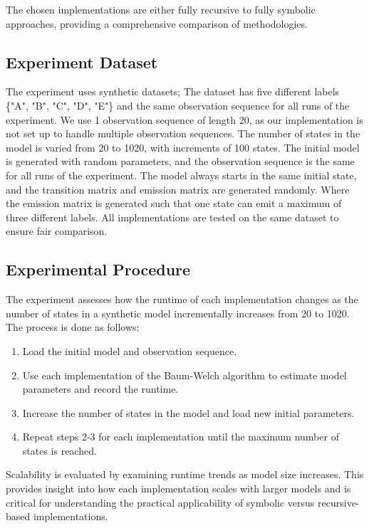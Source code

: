 The chosen implementations are either fully recursive to fully symbolic approaches, providing a comprehensive comparison of methodologies.

\subsection{Experiment Dataset}
The experiment uses synthetic datasets; The dataset has five different labels \{"A", "B", "C", "D", "E"\} and the same observation sequence for all runs of the experiment. 
We use 1 observation sequence of length 20, as our implementation is not set up to handle multiple observation sequences.
The number of states in the model is varied from 20 to 1020, with increments of 100 states.
The initial model is generated with random parameters, and the observation sequence is the same for all runs of the experiment.
The model always starts in the same initial state, and the transition matrix and emission matrix are generated randomly.
Where the emission matrix is generated such that one state can emit a maximum of three different labels.
All implementations are tested on the same dataset to ensure fair comparison.

\subsection{Experimental Procedure}
The experiment assesses how the runtime of each implementation changes as the number of states in a synthetic model incrementally increases from 20 to 1020. 
The process is done as follows:

\begin{enumerate}
\item Load the initial model and observation sequence.
\item Use each implementation of the Baum-Welch algorithm to estimate model parameters and record the runtime.
\item Increase the number of states in the model and load new initial parameters.
\item Repeat steps 2-3 for each implementation until the maximum number of states is reached.
\end{enumerate}

Scalability is evaluated by examining runtime trends as model size increases.
This provides insight into how each implementation scales with larger models and is critical for understanding the practical applicability of symbolic versus recursive-based implementations.

